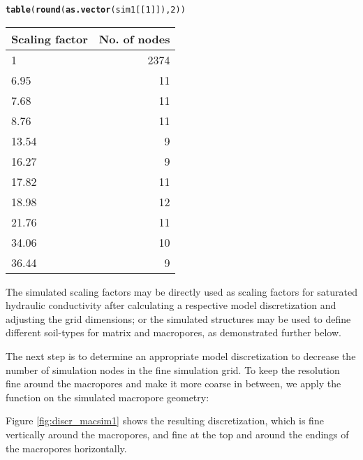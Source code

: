 \documentclass[article,nojss]{jss}\usepackage[]{graphicx}\usepackage[]{xcolor}
\makeatletter
\newcommand{\hlnum}[1]{\textcolor[rgb]{0.686,0.059,0.569}{#1}}%
\newcommand{\hldef}[1]{\textcolor[rgb]{0.345,0.345,0.345}{#1}}%
\newcommand{\hlkwd}[1]{\textcolor[rgb]{0.737,0.353,0.396}{\textbf{#1}}}%
\newenvironment{kframe}{%
 \def\at@end@of@kframe{}%
 \ifinner\ifhmode%
  \def\at@end@of@kframe{\end{minipage}}%
  \begin{minipage}{\columnwidth}%
 \fi\fi%
 \def\FrameCommand##1{\hskip\@totalleftmargin \hskip-\fboxsep
 \colorbox{shadecolor}{##1}\hskip-\fboxsep
     \hskip-\linewidth \hskip-\@totalleftmargin \hskip\columnwidth}%
 \MakeFramed {\advance\hsize-\width
   \@totalleftmargin\z@ \linewidth\hsize
   \@setminipage}}%
 {\par\unskip\endMakeFramed%
 \at@end@of@kframe}
\newenvironment{knitrout}{}{} %
\makeatother
\begin{document}
\begin{knitrout}
\color{fgcolor}\begin{kframe}
\begin{alltt}
 \hlkwd{table}\hldef{(}\hlkwd{round}\hldef{(}\hlkwd{as.vector}\hldef{(sim1[[}\hlnum{1}\hldef{]]),} \hlnum{2}\hldef{))}
\end{alltt}
\end{kframe}
\end{knitrout}
\begin{table}[ht]
\centering
\begin{tabular}{lr}
  \hline
Scaling factor & No. of nodes \\ 
  \hline
1 & 2374 \\ 
  6.95 &  11 \\ 
  7.68 &  11 \\ 
  8.76 &  11 \\ 
  13.54 &   9 \\ 
  16.27 &   9 \\ 
  17.82 &  11 \\ 
  18.98 &  12 \\ 
  21.76 &  11 \\ 
  34.06 &  10 \\ 
  36.44 &   9 \\ 
   \hline
\end{tabular}
\end{table}


The simulated scaling factors may be directly used as scaling factors for saturated
hydraulic conductivity after calculating a respective model discretization
and adjusting the grid dimensions; or the simulated structures may be used to define
different soil-types for matrix and macropores, as demonstrated further below.


The next step is to determine an appropriate model discretization to decrease the 
number of simulation nodes in the fine simulation grid.  
To keep the resolution fine around the macropores and make it more coarse in between, 
we apply the function  on the simulated macropore geometry:



Figure \ref{fig:discr_macsim1} shows the resulting discretization, which is fine vertically
around the macropores, and fine at the top and around the endings of the macropores
horizontally. 
\end{document}
